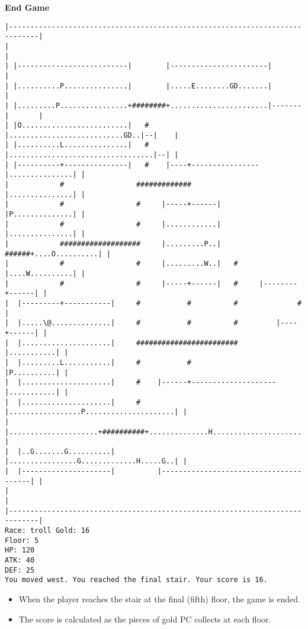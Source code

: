 \documentclass[11pt]{article}
\theoremstyle{plain}
\begin{document}
\newpage
\textbf{End Game}


\begin{Verbatim}[fontsize=\scriptsize]
|-----------------------------------------------------------------------------|
|                                                                             |
| |--------------------------|        |-----------------------|               |
| |..........P...............|        |.....E........GD.......|               |
| |.........P................+########+.......................|-------|       |
| |O.........................|   #    |...........................GD..|--|    |
| |..........L...............|   #    |..................................|--| |
| |----------+---------------|   #    |----+----------------|...............| |
|            #                 #############                |...............| |
|            #                 #     |-----+------|         |P..............| |
|            #                 #     |............|         |...............| |
|            ###################     |.........P..|   ######+....O..........| |
|            #                 #     |.........W..|   #     |....W..........| |
|            #                 #     |-----+------|   #     |--------+------| |
|  |---------+-----------|     #           #          #              #        |
|  |.....\@..............|     #           #          #         |----+------| |
|  |.....................|     ########################         |...........| |
|  |.........L...........|     #           #                    |P..........| |
|  |.....................|     #    |------+--------------------|...........| |
|  |.....................|     #    |.................P.....................| |
|  |.....................+##########+..............H........................| |
|  |..G.......G..........|          |................G.............H.....G..| |
|  |---------------------|          |---------------------------------------| |
|                                                                             |
|-----------------------------------------------------------------------------|
Race: troll Gold: 16                                                   Floor: 5
HP: 120
ATK: 40
DEF: 25
You moved west. You reached the final stair. Your score is 16.  
\end{Verbatim}

\begin{itemize}
    \item When the player reaches the stair at the final (fifth) floor, the game
    is ended.
    \item The score is calculated as the pieces of gold PC collects at each floor.
\end{itemize}
\end{document}
